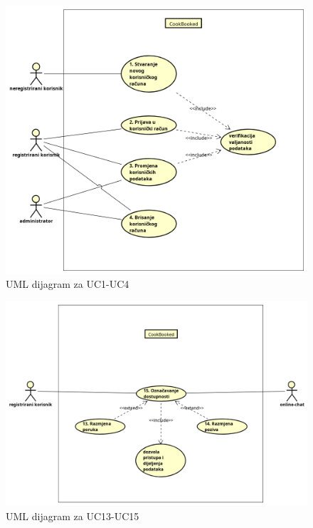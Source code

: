					\begin{figure}[H]
						\centering
						\includegraphics[width=1.1\linewidth]{"slike/dijagrami/UML 1-4"}
						\caption{UML dijagram za UC1-UC4}
						\label{fig:uml-1-4}
					\end{figure}
				
					\begin{figure}[H]
						\centering
						\includegraphics[width=1.1\linewidth]{"slike/dijagrami/UML 13-14"}
						\caption{UML dijagram za UC13-UC15}
						\label{fig:uml-13-15}
					\end{figure}
		
				
				\eject		
				
